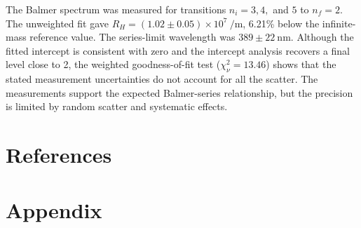 \documentclass[12pt,a4paper]{article}
\begin{document}
The Balmer spectrum was measured for transitions
$n_i=3,4,$ and $5$ to $n_f=2$. The unweighted fit gave
$R_H=(1.02\pm0.05)\times10^7\ \si{\per\metre}$, 6.21\%
below the infinite-mass reference value. The series-limit
wavelength was $389\pm22\ \si{\nano\metre}$. Although
the fitted intercept is consistent with zero and the
intercept analysis recovers a final level close to 2, the
weighted goodness-of-fit test ($\chi^2_\nu=13.46$) shows
that the stated measurement uncertainties do not account
for all the scatter. The measurements support the expected
Balmer-series relationship, but the precision is limited
by random scatter and systematic effects.

\newpage

\section{References}
\printbibliography

\newpage

\appendix

\section{Appendix}
\end{document}
